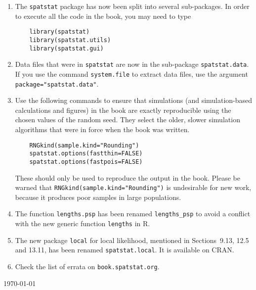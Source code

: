 \documentclass[12pt,a4paper]{article}
\begin{document}
\begin{enumerate}
\item The \texttt{spatstat} package has now been split into several
  sub-packages. In order to execute all the code in the book,
  you may need to type
\begin{verbatim}
    library(spatstat)
    library(spatstat.utils)
    library(spatstat.gui)
\end{verbatim}
\item Data files that were in \texttt{spatstat}
  are now in the sub-package \texttt{spatstat.data}.
  If you use the command \texttt{system.file} to extract data files,
  use the argument \texttt{package="spatstat.data"}.
\item 
  Use the following commands to ensure that simulations
  (and simulation-based calculations and figures) in the book
  are exactly reproducible using the chosen values of the random seed.
  They select the older, slower
  simulation algorithms that were in force when the book was written.
\begin{verbatim}
    RNGkind(sample.kind="Rounding")
    spatstat.options(fastthin=FALSE)
    spatstat.options(fastpois=FALSE)
\end{verbatim}
  These should only be used to reproduce the output in the book.
  Please be warned that \texttt{RNGkind(sample.kind="Rounding")} is undesirable
  for new work, because it produces poor samples in large populations.
\item
  The function \texttt{lengths.psp} has been renamed \verb!lengths_psp!
  to avoid a conflict with the new generic function \texttt{lengths}
  in \textsf{R}.
\item
  The new package \texttt{local} for local likelihood, mentioned
  in Sections~9.13, 12.5 and 13.11, has been renamed \texttt{spatstat.local}.
  It is available on CRAN.
\item
  Check the list of errata on \texttt{book.spatstat.org}.
\end{enumerate}

\vspace*{\fill}


\hspace*{\fill} \today
\end{document}
